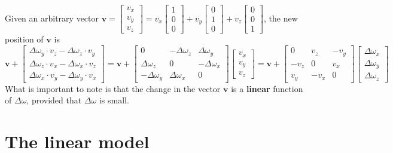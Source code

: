 \documentclass{article}
\begin{document}
Given an arbitrary vector \(\mathbf{v} = \begin{bmatrix} v_x \\ v_y \\ v_z \end{bmatrix} = v_x\begin{bmatrix} 1 \\ 0 \\ 0 \end{bmatrix} + v_y\begin{bmatrix} 0 \\ 1 \\ 0 \end{bmatrix} + v_z\begin{bmatrix} 0 \\ 0 \\ 1 \end{bmatrix}\), the new position of \(\mathbf{v}\) is 
\[\mathbf{v} + \begin{bmatrix} \Delta\omega_y \cdot v_z - \Delta\omega_z \cdot v_y \\ \Delta\omega_z \cdot v_x - \Delta\omega_x \cdot v_z \\ \Delta\omega_x \cdot v_y - \Delta\omega_y \cdot v_x \end{bmatrix} 
= \mathbf{v} + \begin{bmatrix} 0 & -\Delta\omega_z & \Delta\omega_y \\ \Delta\omega_z & 0 & -\Delta\omega_x \\ -\Delta\omega_y & \Delta\omega_x & 0 \end{bmatrix}\begin{bmatrix} v_x \\ v_y \\ v_z \end{bmatrix} 
= \mathbf{v} + \begin{bmatrix} 0 & v_z & -v_y \\ -v_z & 0 & v_x \\ v_y & -v_x & 0 \end{bmatrix}\begin{bmatrix} \Delta\omega_x \\ \Delta\omega_y \\ \Delta\omega_z \end{bmatrix}\]
What is important to note is that the change in the vector \(\mathbf{v}\) is a {\bf linear} function of \(\Delta\omega\), provided that \(\Delta\omega\) is small. 



\section{The linear model}
\end{document}
